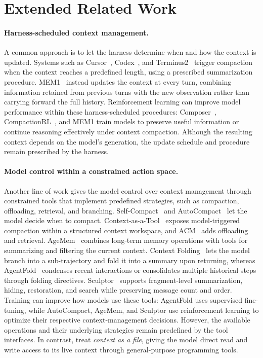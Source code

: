 \section{Extended Related Work}
\label{app:extended_related_work}

\paragraph{Harness-scheduled context management.}
A common approach is to let the harness determine when and how the context is updated. Systems such as Cursor~\citep{cassano2026trainingcomposer}, Codex~\citep{openai2026codex}, and Terminus2~\citep{merrill2026terminal} trigger compaction when the context reaches a predefined length, using a prescribed summarization procedure. MEM1~\citep{zhou2026mem1} instead updates the context at every turn, combining information retained from previous turns with the new observation rather than carrying forward the full history.
Reinforcement learning can improve model performance within these harness-scheduled procedures: Composer~\citep{cassano2026trainingcomposer,chan2026composer}, CompactionRL~\citep{li2026compactionrl}, and MEM1 train models to preserve useful information or continue reasoning effectively under context compaction. Although the resulting context depends on the model's generation, the update schedule and procedure remain prescribed by the harness.

\paragraph{Model control within a constrained action space.}
Another line of work gives the model control over context management through constrained tools that implement predefined strategies, such as compaction, offloading, retrieval, and branching. Self-Compact~\citep{li2026self} and AutoCompact~\citep{zhang2026autocompact} let the model decide when to compact. Context-as-a-Tool~\citep{liu2026context} exposes model-triggered compaction within a structured context workspace, and ACM~\citep{li2026acm} adds offloading and retrieval. AgeMem~\citep{yu2026agentic} combines long-term memory operations with tools for summarizing and filtering the current context. Context Folding~\citep{sun2025scaling} lets the model branch into a sub-trajectory and fold it into a summary upon returning, whereas AgentFold~\citep{ye2025agentfold} condenses recent interactions or consolidates multiple historical steps through folding directives. Sculptor~\citep{li2026sculptor} supports fragment-level summarization, hiding, restoration, and search while preserving message count and order.
Training can improve how models use these tools: AgentFold uses supervised fine-tuning, while AutoCompact, AgeMem, and Sculptor use reinforcement learning to optimize their respective context-management decisions. However, the available operations and their underlying strategies remain predefined by the tool interfaces. 
In contrast, \oursplural{} treat \emph{context as a file}, giving the model direct read and write access to its live context through general-purpose programming tools.

